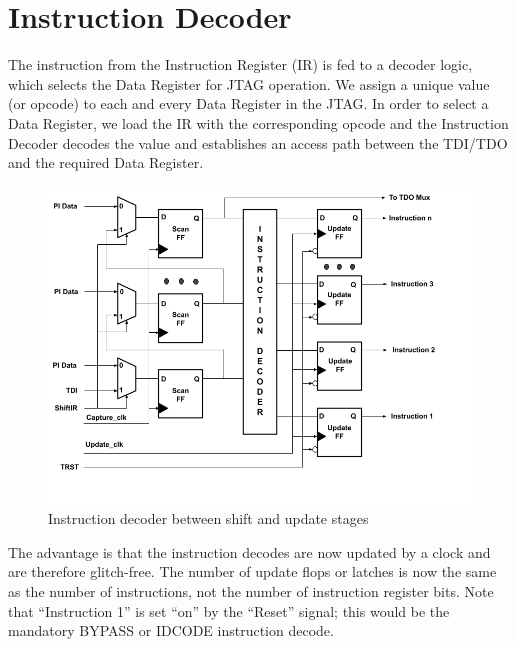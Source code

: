 \newpage

\section{Instruction Decoder}
\label{sec:instruction-decoder}
The instruction from the Instruction Register (IR) is fed to a decoder logic, which selects the Data Register for JTAG operation. We assign a unique value (or opcode) to each and every Data Register in the JTAG. In order to select a Data Register, we load the IR with the corresponding opcode and the Instruction Decoder decodes the value and establishes an access path between the TDI/TDO and the required Data Register.

\vspace{1cm}
\begin{figure}[H]
    \centering
    \includegraphics[width = 15cm]{images/instruction_register_shift_update.png}
    \vspace{1cm}
    \caption{Instruction decoder between shift and update stages}
    \label{fig:instruction-decoder}
\end{figure}
\vspace{1cm}

The advantage is that the instruction decodes are now updated by a clock and are therefore glitch-free. The number of update flops or latches is now the same as the number of instructions, not the number of instruction register bits. Note that “Instruction 1” is set “on” by the “Reset” signal; this would be the mandatory BYPASS or IDCODE instruction decode.
